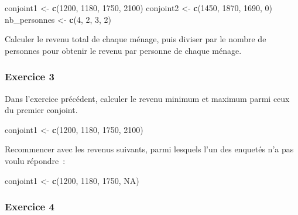 \documentclass[
  12pt,
]{book}
\newenvironment{Shaded}{\begin{snugshade}}{\end{snugshade}}
\newcommand{\DecValTok}[1]{\textcolor[rgb]{0.00,0.00,0.81}{#1}}
\newcommand{\KeywordTok}[1]{\textcolor[rgb]{0.13,0.29,0.53}{\textbf{#1}}}
\newcommand{\NormalTok}[1]{#1}
\newcommand{\OtherTok}[1]{\textcolor[rgb]{0.56,0.35,0.01}{#1}}
\newcommand{\StringTok}[1]{\textcolor[rgb]{0.31,0.60,0.02}{#1}}
\begin{document}
\begin{Shaded}
\begin{Highlighting}[]
\NormalTok{conjoint1 \textless{}{-}}\StringTok{ }\KeywordTok{c}\NormalTok{(}\DecValTok{1200}\NormalTok{, }\DecValTok{1180}\NormalTok{, }\DecValTok{1750}\NormalTok{, }\DecValTok{2100}\NormalTok{)}
\NormalTok{conjoint2 \textless{}{-}}\StringTok{ }\KeywordTok{c}\NormalTok{(}\DecValTok{1450}\NormalTok{, }\DecValTok{1870}\NormalTok{, }\DecValTok{1690}\NormalTok{, }\DecValTok{0}\NormalTok{)}
\NormalTok{nb\_personnes \textless{}{-}}\StringTok{ }\KeywordTok{c}\NormalTok{(}\DecValTok{4}\NormalTok{, }\DecValTok{2}\NormalTok{, }\DecValTok{3}\NormalTok{, }\DecValTok{2}\NormalTok{)}
\end{Highlighting}
\end{Shaded}

Calculer le revenu total de chaque ménage, puis diviser par le nombre de personnes pour obtenir le revenu par personne de chaque ménage.

\hypertarget{exercice-3}{%
\subsubsection{Exercice 3}\label{exercice-3}}

Dans l'exercice précédent, calculer le revenu minimum et maximum parmi ceux du premier conjoint.

\begin{Shaded}
\begin{Highlighting}[]
\NormalTok{conjoint1 \textless{}{-}}\StringTok{ }\KeywordTok{c}\NormalTok{(}\DecValTok{1200}\NormalTok{, }\DecValTok{1180}\NormalTok{, }\DecValTok{1750}\NormalTok{, }\DecValTok{2100}\NormalTok{)}
\end{Highlighting}
\end{Shaded}

Recommencer avec les revenus suivants, parmi lesquels l'un des enquetés n'a pas voulu répondre~:

\begin{Shaded}
\begin{Highlighting}[]
\NormalTok{conjoint1 \textless{}{-}}\StringTok{ }\KeywordTok{c}\NormalTok{(}\DecValTok{1200}\NormalTok{, }\DecValTok{1180}\NormalTok{, }\DecValTok{1750}\NormalTok{, }\OtherTok{NA}\NormalTok{)}
\end{Highlighting}
\end{Shaded}

\hypertarget{exercice-4}{%
\subsubsection{Exercice 4}\label{exercice-4}}
\end{document}
